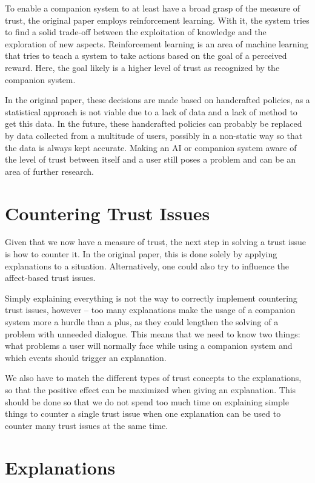 \documentclass[a4paper]{article}
\begin{document}
To enable a companion system to at least have a broad grasp of the measure of trust, the original paper employs reinforcement learning. With it, the system tries to find a solid trade-off between the exploitation of knowledge and the exploration of new aspects. Reinforcement learning is an area of machine learning that tries to teach a system to take actions based on the goal of a perceived reward. Here, the goal likely is a higher level of trust as recognized by the companion system.

In the original paper, these decisions are made based on handcrafted policies, as a statistical approach is not viable due to a lack of data and a lack of method to get this data. In the future, these handcrafted policies can probably be replaced by data collected from a multitude of users, possibly in a non-static way so that the data is always kept accurate. Making an AI or companion system aware of the level of trust between itself and a user still poses a problem and can be an area of further research.

\section{Countering Trust Issues}

Given that we now have a measure of trust, the next step in solving a trust issue is how to counter it. In the original paper, this is done solely by applying explanations to a situation. Alternatively, one could also try to influence the affect-based trust issues.

Simply explaining everything is not the way to correctly implement countering trust issues, however – too many explanations make the usage of a companion system more a hurdle than a plus, as they could lengthen the solving of a problem with unneeded dialogue. This means that we need to know two things: what problems a user will normally face while using a companion system and which events should trigger an explanation.

We also have to match the different types of trust concepts to the explanations, so that the positive effect can be maximized when giving an explanation. This should be done so that we do not spend too much time on explaining simple things to counter a single trust issue when one explanation can be used to counter many trust issues at the same time.

\section{Explanations}
\end{document}
